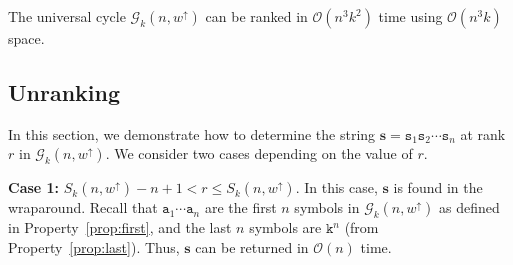 \documentclass[US-letter,USenglish,authorcolumns,autoref]{lipics-v2021}
\renewcommand{\tt} {\mathtt}
\newcommand{\bN}{\mathbf{N}}
\newcommand{\bp}{\mathbf{p}}
\newcommand{\bs}{\mathbf{s}}
\newcommand{\red}[1] {\textcolor{red}{#1}}
\DeclareMathOperator{\ap}{ap}
\begin{document}
%

\noindent


\begin{theorem}
The universal cycle $\mathcal{G}_k(n,w^\uparrow)$  can be ranked in $\mathcal{O}(n^3k^2)$ time using $\mathcal{O}(n^3k)$ space.
\end{theorem}

\subsection{Unranking}


In this section, we demonstrate how to determine the string $\bs = \tt{s}_1\tt{s}_2\cdots \tt{s}_n$ at rank $r$ in $\mathcal{G}_k(n,w^\uparrow)$.   We consider two cases depending on the value of $r$.
%

{\bf Case 1:}  $S_k(n,w^\uparrow) - n +1 < r \leq S_k(n,w^\uparrow)$.  In this case, $\bs$ is found in the wraparound.  Recall that $\tt{a}_1\cdots \tt{a}_n$ are the first $n$ symbols in $\mathcal{G}_k(n,w^\uparrow)$ as defined in Property~\ref{prop:first}, and the last $n$ symbols  are $\tt{k}^n$ (from Property~\ref{prop:last}).  Thus, $\bs$ can be returned in $\mathcal{O}(n)$ time.
 
\end{document}
